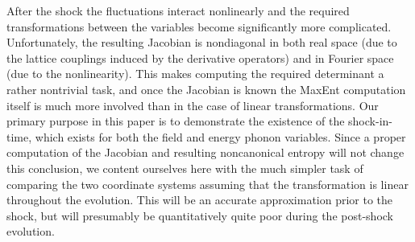 \documentclass[11pt,a4paper]{article}
\begin{document}
After the shock the fluctuations interact nonlinearly and the required transformations between the variables become significantly more complicated.
Unfortunately, the resulting Jacobian is nondiagonal in both real space (due to the lattice couplings induced by the derivative operators) and in Fourier space (due to the nonlinearity).
This makes computing the required determinant a rather nontrivial task, and once the Jacobian is known the MaxEnt computation itself is much more involved than in the case of linear transformations.
Our primary purpose in this paper is to demonstrate the existence of the shock-in-time, which exists for both the field and energy phonon variables.
Since a proper computation of the Jacobian and resulting noncanonical entropy will not change this conclusion, we content ourselves here with the much simpler task of comparing the two coordinate systems assuming that the transformation is linear throughout the evolution. 
This will be an accurate approximation prior to the shock, but will presumably be quantitatively quite poor during the post-shock evolution.
\end{document}
